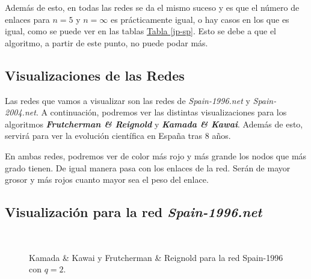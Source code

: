 \documentclass[paper=a4, fontsize=11pt]{article} %
\numberwithin{equation}{section} %
\numberwithin{figure}{section} %
\numberwithin{table}{section} %
\begin{document}
Además de esto, en todas las redes se da el mismo suceso y es que el número de enlaces para $n=5$ y $n = \infty$ es prácticamente igual, o hay casos en los que es igual, como se puede ver en las tablas \hyperref[jp-sp]{Tabla \ref*{jp-sp}}. Esto se debe a que el algoritmo, a partir de este punto, no puede podar más.

\subsection{Visualizaciones de las Redes}


Las redes que vamos a visualizar son las redes de \textit{Spain-1996.net} y \textit{Spain-2004.net}. A continuación, podremos ver las distintas visualizaciones para los algoritmos \textbf{\textit{Frutcherman \& Reignold}} y \textbf{\textit{Kamada \& Kawai}}. Además de esto, servirá para ver la evolución científica en España tras 8 años.

En ambas redes, podremos ver de color más rojo y más grande los nodos que más grado tienen. De igual manera pasa con los enlaces de la red. Serán de mayor grosor y más rojos cuanto mayor sea el peso del enlace.

\subsection{Visualización para la red \textit{Spain-1996.net}}

\begin{figure}[H]
    \centering
    \mbox {
      \qquad
    }
    \caption{Kamada \& Kawai y Frutcherman \& Reignold para la red Spain-1996 con $q=2$.}
    \label{spq2}
\end{figure}
\end{document}
